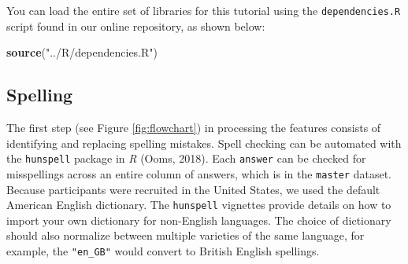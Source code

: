 \documentclass[man]{apa6}
\newenvironment{Shaded}{\begin{snugshade}}{\end{snugshade}}
\newcommand{\CommentTok}[1]{\textcolor[rgb]{0.56,0.35,0.01}{\textit{#1}}}
\newcommand{\DataTypeTok}[1]{\textcolor[rgb]{0.13,0.29,0.53}{#1}}
\newcommand{\KeywordTok}[1]{\textcolor[rgb]{0.13,0.29,0.53}{\textbf{#1}}}
\newcommand{\NormalTok}[1]{#1}
\newcommand{\OperatorTok}[1]{\textcolor[rgb]{0.81,0.36,0.00}{\textbf{#1}}}
\newcommand{\StringTok}[1]{\textcolor[rgb]{0.31,0.60,0.02}{#1}}
\begin{document}
You can load the entire set of libraries for this tutorial using the \texttt{dependencies.R} script found in our online repository, as shown below:

\scriptsize

\begin{Shaded}
\begin{Highlighting}[]
\KeywordTok{source}\NormalTok{(}\StringTok{"../R/dependencies.R"}\NormalTok{)}
\end{Highlighting}
\end{Shaded}

\normalsize

\hypertarget{spelling}{%
\subsection{Spelling}\label{spelling}}

The first step (see Figure \ref{fig:flowchart}) in processing the features consists of identifying and replacing spelling mistakes. Spell checking can be automated with the \texttt{hunspell} package in \emph{R} (Ooms, 2018). Each \texttt{answer} can be checked for misspellings across an entire column of answers, which is in the \texttt{master} dataset. Because participants were recruited in the United States, we used the default American English dictionary. The \texttt{hunspell} vignettes provide details on how to import your own dictionary for non-English languages. The choice of dictionary should also normalize between multiple varieties of the same language, for example, the \texttt{"en\_GB"} would convert to British English spellings.

\scriptsize

\begin{Shaded}
\end{Shaded}
\end{document}
